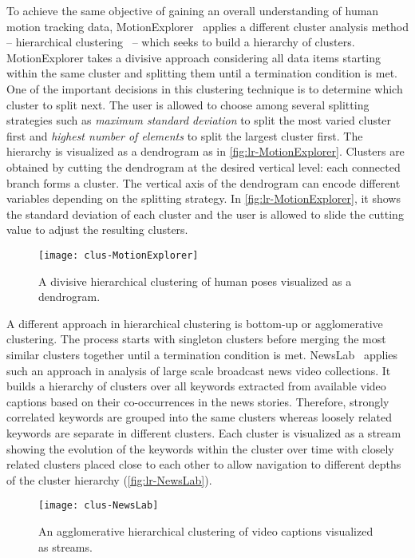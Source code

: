 To achieve the same objective of gaining an overall understanding of human motion tracking data, MotionExplorer~\cite{Bernard2013} applies a different cluster analysis method -- hierarchical clustering~\cite{Han2011} -- which seeks to build a hierarchy of clusters. MotionExplorer takes a divisive approach considering all data items starting within the same cluster and splitting them until a termination condition is met. One of the important decisions in this clustering technique is to determine which cluster to split next. The user is allowed to choose among several splitting strategies such as \emph{maximum standard deviation} to split the most varied cluster first and \emph{highest number of elements} to split the largest cluster first. The hierarchy is visualized as a dendrogram as in \autoref{fig:lr-MotionExplorer}. Clusters are obtained by cutting the dendrogram at the desired vertical level: each connected branch forms a cluster. The vertical axis of the dendrogram can encode different variables depending on the splitting strategy. In \autoref{fig:lr-MotionExplorer}, it shows the standard deviation of each cluster and the user is allowed to slide the cutting value to adjust the resulting clusters.

\begin{figure}[!htb]
	\centering
	\texttt{[image: clus-MotionExplorer]}
	\caption{A divisive hierarchical clustering of human poses visualized as a dendrogram. }
	\label{fig:lr-MotionExplorer}
\end{figure}

A different approach in hierarchical clustering is bottom-up or agglomerative clustering. The process starts with singleton clusters before merging the most similar clusters together until a termination condition is met. NewsLab~\cite{Ghoniem2007} applies such an approach in analysis of large scale broadcast news video collections. It builds a hierarchy of clusters over all keywords extracted from available video captions based on their co-occurrences in the news stories. Therefore, strongly correlated keywords are grouped into the same clusters whereas loosely related keywords are separate in different clusters. Each cluster is visualized as a stream showing the evolution of the keywords within the cluster over time with closely related clusters placed close to each other to allow navigation to different depths of the cluster hierarchy (\autoref{fig:lr-NewsLab}).

\begin{figure}[!htb]
	\centering
	\texttt{[image: clus-NewsLab]}
	\caption{An agglomerative hierarchical clustering of video captions visualized as streams. }
	\label{fig:lr-NewsLab}
\end{figure}

